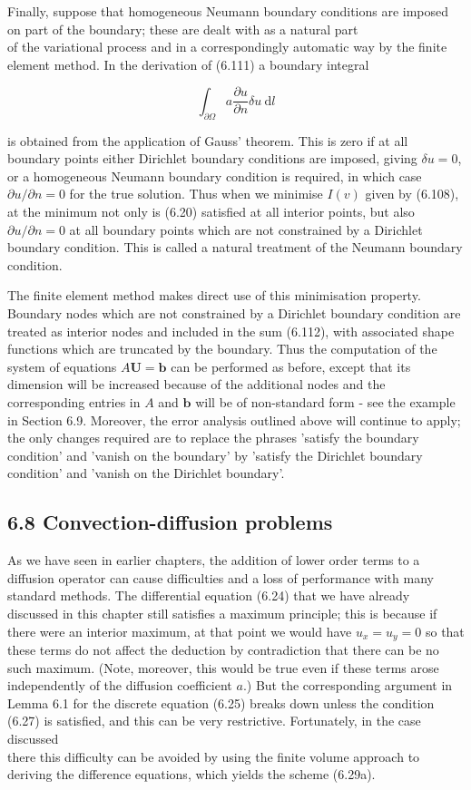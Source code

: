 \documentclass[10pt]{article}
\begin{document}
Finally, suppose that homogeneous Neumann boundary conditions are imposed on part of the boundary; these are dealt with as a natural part\\
of the variational process and in a correspondingly automatic way by the finite element method. In the derivation of (6.111) a boundary integral

\[
\int_{\partial \Omega} a \frac{\partial u}{\partial n} \delta u \mathrm{~d} l
\]

is obtained from the application of Gauss' theorem. This is zero if at all boundary points either Dirichlet boundary conditions are imposed, giving \(\delta u=0\), or a homogeneous Neumann boundary condition is required, in which case \(\partial u / \partial n=0\) for the true solution. Thus when we minimise \(I(v)\) given by (6.108), at the minimum not only is (6.20) satisfied at all interior points, but also \(\partial u / \partial n=0\) at all boundary points which are not constrained by a Dirichlet boundary condition. This is called a natural treatment of the Neumann boundary condition.

The finite element method makes direct use of this minimisation property. Boundary nodes which are not constrained by a Dirichlet boundary condition are treated as interior nodes and included in the sum (6.112), with associated shape functions which are truncated by the boundary. Thus the computation of the system of equations \(A \mathbf{U}=\mathbf{b}\) can be performed as before, except that its dimension will be increased because of the additional nodes and the corresponding entries in \(A\) and \(\mathbf{b}\) will be of non-standard form - see the example in Section 6.9. Moreover, the error analysis outlined above will continue to apply; the only changes required are to replace the phrases 'satisfy the boundary condition' and 'vanish on the boundary' by 'satisfy the Dirichlet boundary condition' and 'vanish on the Dirichlet boundary'.

\subsection*{6.8 Convection-diffusion problems}
As we have seen in earlier chapters, the addition of lower order terms to a diffusion operator can cause difficulties and a loss of performance with many standard methods. The differential equation (6.24) that we have already discussed in this chapter still satisfies a maximum principle; this is because if there were an interior maximum, at that point we would have \(u_{x}=u_{y}=0\) so that these terms do not affect the deduction by contradiction that there can be no such maximum. (Note, moreover, this would be true even if these terms arose independently of the diffusion coefficient \(a\).) But the corresponding argument in Lemma 6.1 for the discrete equation (6.25) breaks down unless the condition (6.27) is satisfied, and this can be very restrictive. Fortunately, in the case discussed\\
there this difficulty can be avoided by using the finite volume approach to deriving the difference equations, which yields the scheme (6.29a).
\end{document}
